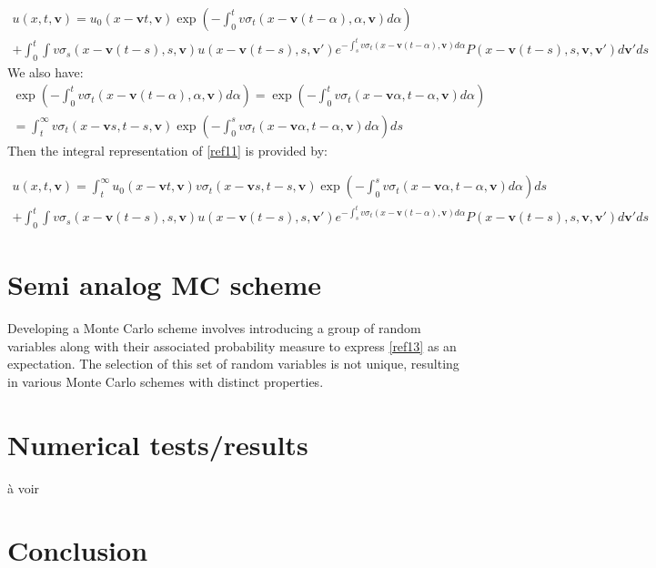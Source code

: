 \documentclass[a4paper, 11pt]{article}
\begin{document}
\begin{multline}
	u(x,t,\textbf{v}) = u_0(x - \textbf{v}t, \textbf{v}) \exp\left(- \int_{0}^{t} v\sigma_t\left(x - \textbf{v}(t - \alpha), \alpha, \textbf{v}\right) d\alpha\right) \\
	+ \int_{0}^{t} \int v\sigma_s\left(x - \textbf{v}(t - s), s, \textbf{v}\right) u\left(x - \textbf{v}(t - s), s, \textbf{v}'\right) e^{- \int_s^t v\sigma_t\left(x - \textbf{v}(t - \alpha), \textbf{v}\right) d\alpha} P\left(x - \textbf{v}(t - s), s, \textbf{v}, \textbf{v}'\right) d\textbf{v}'ds \label{ref1}
\end{multline}
We also have:
\begin{multline}
	\exp\left(- \int_{0}^{t} v\sigma_t\left(x - \textbf{v}(t - \alpha), \alpha, \textbf{v}\right) d\alpha\right) = \exp\left(- \int_{0}^{t} v\sigma_t\left(x - \textbf{v} \alpha,t- \alpha, \textbf{v}\right) d\alpha\right) \\ = \int _t^\infty  v\sigma_t\left(x - \textbf{v} s,t- s, \textbf{v}\right)
	\exp\left(- \int_{0}^{s} v\sigma_t\left(x - \textbf{v} \alpha,t- \alpha, \textbf{v}\right) d\alpha\right) ds
\end{multline}
Then the integral representation of \ref{ref11} is provided by:

\begin{multline}
	u(x,t,\textbf{v}) =  \int _t^\infty  u_0(x - \textbf{v}t, \textbf{v}) v\sigma_t\left(x - \textbf{v} s,t- s, \textbf{v}\right)
	\exp\left(- \int_{0}^{s} v\sigma_t\left(x - \textbf{v} \alpha,t- \alpha, \textbf{v}\right) d\alpha\right) ds\\
	+ \int_{0}^{t} \int v\sigma_s\left(x - \textbf{v}(t - s), s, \textbf{v}\right) u\left(x - \textbf{v}(t - s), s, \textbf{v}'\right) e^{- \int_s^t v\sigma_t\left(x - \textbf{v}(t - \alpha), \textbf{v}\right) d\alpha} P\left(x - \textbf{v}(t - s), s, \textbf{v}, \textbf{v}'\right) d\textbf{v}'ds \label{ref13}
\end{multline}


\section{Semi analog MC scheme}

Developing a Monte Carlo scheme involves introducing a group of random variables along with their associated probability measure to express \ref{ref13} as an expectation. The selection of this set of random variables is not unique, resulting in various Monte Carlo schemes with distinct properties.

\section{Numerical tests/results}

à voir

\section{Conclusion}


	
	
\end{document}
